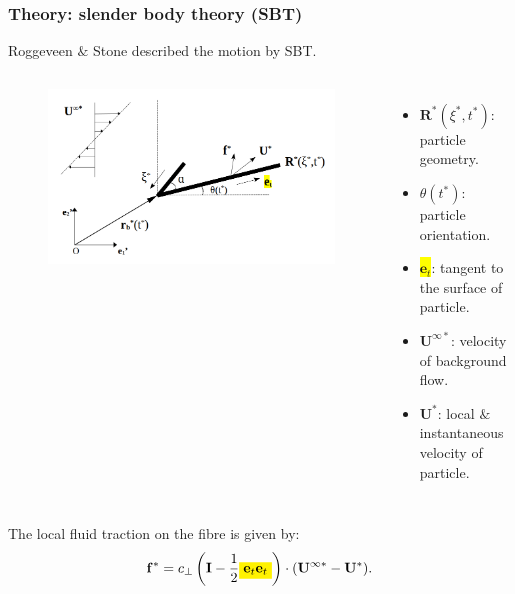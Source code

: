 \documentclass{beamer}
\newcommand{\bi}{\begin{itemize}}
\newcommand{\ei}{\end{itemize}}
\begin{document}


\begin{frame}
	\frametitle{Theory: slender body theory (SBT)}
	\begin{overlayarea}{\textwidth}{\textheight}
		\vspace{-0.5cm}\small Roggeveen $\&$ Stone described the motion by SBT. \normalsize
		\begin{columns}
			\begin{figure}[htb]
				\begin{center}
					\includegraphics[width=1\textwidth]{plots/schematic/schematic_rigid_configuration_color3.png}
				\end{center}
			\end{figure}
			\small \bi 
			\item $\mathbf{R}^*(\xi^*,t^*)$: particle geometry.
			\item $\theta(t^*)$: particle orientation.
			\item \colorbox{yellow}{$\mathbf{e}_t$}: tangent to the surface of particle.
			\item $\mathbf{U}^{\infty*}$: velocity of background flow.
			\item $\mathbf{U}^*$: local $\&$ instantaneous velocity of particle.
			\ei
		\end{columns}\vspace{0.5cm}
	The local fluid traction on the fibre is given by: 
		\begin{equation*}
			\mathbf{f}^*=c_\perp\left(\mathbf{I}-\frac{1}{2}\colorbox{yellow}{$\mathbf{e}_t\mathbf{e}_t$}\right)\cdot(\mathbf{U}^{\infty*}-\mathbf{U}^*).
		\end{equation*}
	\end{overlayarea}
\end{frame}
\end{document}
